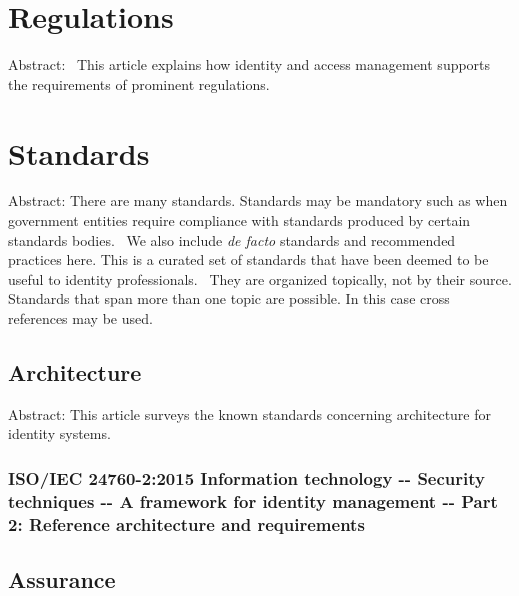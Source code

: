 \hypertarget{regulations}{%
\section{Regulations}\label{regulations}}

Abstract:~ This article explains how identity and access management
supports the requirements of prominent regulations.

\hypertarget{standards}{%
\section{Standards}\label{standards}}

Abstract: There are many standards. Standards may be mandatory such as
when government entities require compliance with standards produced by
certain standards bodies.~ We also include \emph{de facto} standards and
recommended practices here. This is a curated set of standards that have
been deemed to be useful to identity professionals.~ They are organized
topically, not by their source. Standards that span more than one topic
are possible. In this case cross references may be used.

\hypertarget{architecture}{%
\subsection{Architecture}\label{architecture}}

Abstract: This article surveys the known standards concerning
architecture for identity systems.

\hypertarget{isoiec-24760-22015-information-technology----security-techniques----a-framework-for-identity-management----part-2-reference-architecture-and-requirements}{%
\subsubsection{ISO/IEC 24760-2:2015 Information technology -\/- Security
techniques -\/- A framework for identity management -\/- Part 2:
Reference architecture and
requirements}\label{isoiec-24760-22015-information-technology----security-techniques----a-framework-for-identity-management----part-2-reference-architecture-and-requirements}}

\hypertarget{assurance}{%
\subsection{Assurance}\label{assurance}}

